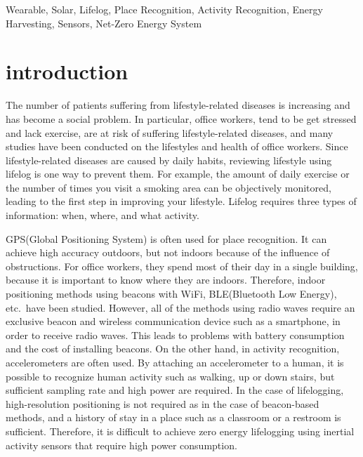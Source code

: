 \documentclass[conference]{IEEEtran}
\begin{document}
\begin{IEEEkeywords}
Wearable, Solar, Lifelog, Place Recognition, Activity Recognition, Energy Harvesting, Sensors, Net-Zero Energy System
\end{IEEEkeywords}

\section{introduction} \label{sec:intro}
The number of patients suffering from lifestyle-related diseases is increasing and has become a social problem. In particular, office workers, tend to be get stressed and lack exercise, are at risk of suffering lifestyle-related diseases, and many studies have been conducted on the lifestyles and health of office workers\cite{daneshmandi2017adverse,shariat2017application}.
Since lifestyle-related diseases are caused by daily habits, reviewing lifestyle using lifelog is one way to prevent them. For example, the amount of daily exercise or the number of times you visit a smoking area can be objectively monitored, leading to the first step in improving your lifestyle.
Lifelog requires three types of information: when, where, and what activity.

GPS(Global Positioning System) is often used for place recognition.
It can achieve high accuracy outdoors, but not indoors because of the influence of obstructions.
For office workers, they spend most of their day in a single building, because it is important to know where they are indoors.
Therefore, indoor positioning methods using beacons with WiFi, BLE(Bluetooth Low Energy), etc.\ have been studied\cite{zou2017winips,robesaat2017improved,flab/ishida16:iiai_aai_eskm,flab/ishida18:iiai_aai_eskm}.
However, all of the methods using radio waves require an exclusive beacon and wireless communication device such as a smartphone, in order to receive radio waves.
This leads to problems with battery consumption and the cost of installing beacons.
On the other hand, in activity recognition, accelerometers are often used.
By attaching an accelerometer to a human, it is possible to recognize human activity such as walking, up or down stairs, but sufficient sampling rate and high power are required.
In the case of lifelogging, high-resolution positioning is not required as in the case of beacon-based methods, and a history of stay in a place such as a classroom or a restroom is sufficient.
Therefore, it is difficult to achieve zero energy lifelogging using inertial activity sensors that require high power consumption.
\end{document}
